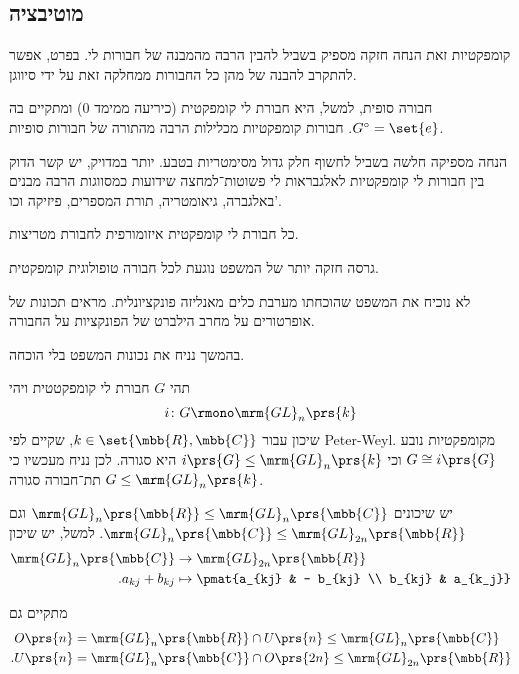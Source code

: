 \documentclass[10pt, twoside]{book}
\newcommand{\textenglish}[1]{\foreignlanguage{english}{#1}}
\begin{document}
\subsection{מוטיבציה}

קומפקטיות זאת הנחה חזקה מספיק בשביל להבין הרבה מהמבנה של חבורות לי. בפרט, אפשר להתקרב להבנה של מהן כל החבורות ממחלקה זאת על ידי סיווגן.

חבורה סופית, למשל, היא חבורת לי קומפקטית (כיריעה ממימד 0) ומתקיים בה
$G^\circ = \set{e}$.
חבורות קומפקטיות מכלילות הרבה מהתורה של חבורות סופיות.

הנחה מספיקה חלשה בשביל לחשוף חלק גדול מסימטריות בטבע. יותר במדויק, יש קשר הדוק בין חבורות לי קומפקטיות לאלגבראות לי פשוטות־למחצה שידועות כמסווגות הרבה מבנים באלגברה, גיאומטריה, תורת המספרים, פיזיקה וכו'.

\begin{theorem}[\textenglish{Peter-Weyl}]
כל חבורת לי קומפקטית איזומורפית לחבורת מטריצות.
\end{theorem}

\begin{remark}
גרסה חזקה יותר של המשפט נוגעת לכל חבורה טופולוגית קומפקטית.

לא נוכיח את המשפט שהוכחתו מערבת כלים מאנליזה פונקציונלית. מראים תכונות של אופרטורים על מחרב הילברט של הפונקציות על החבורה.

בהמשך נניח את נכונות המשפט בלי הוכחה.
\end{remark}


תהי
$G$
חבורת לי קומפקטטית ויהי
\[i \colon G \rmono \mrm{GL}_n\prs{k}\]
שיכון עבור
$k \in \set{\mbb{R}, \mbb{C}}$,
שקיים לפי
\textenglish{Peter-Weyl}.
מקומפקטיות נובע
$G \cong i\prs{G}$
וכי
$i\prs{G} \leq \mrm{GL}_n\prs{k}$
היא סגורה.
לכן נניח מעכשיו כי
$G \leq \mrm{GL}_n\prs{k}$
תת־חבורה סגורה.

\begin{remark}
יש שיכונים
$\mrm{GL}_n\prs{\mbb{R}} \leq \mrm{GL}_n\prs{\mbb{C}}$
וגם
$\mrm{GL}_n\prs{\mbb{C}} \leq \mrm{GL}_{2n}\prs{\mbb{R}}$.
למשל, יש שיכון
\begin{align*}
\mrm{GL}_n\prs{\mbb{C}} &\to \mrm{GL}_{2n}\prs{\mbb{R}} \\
\text{.} a_{kj} + b_{kj} &\mapsto \pmat{a_{kj} & - b_{kj} \\ b_{kj} & a_{k_j}}
\end{align*}

מתקיים גם
\begin{align*}
O\prs{n} &= \mrm{GL}_n\prs{\mbb{R}} \cap U\prs{n} \leq \mrm{GL}_n\prs{\mbb{C}} \\
\text{.} U\prs{n} &= \mrm{GL}_n\prs{\mbb{C}} \cap O\prs{2n} \leq \mrm{GL}_{2n}\prs{\mbb{R}}
\end{align*}
\end{remark}
\end{document}
